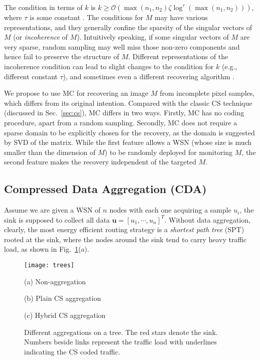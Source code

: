 \documentclass[conference]{IEEEtran}
\begin{document}
    The condition in terms of $k$ is $k \ge \mathcal{O}(\max(n_1,n_2) \zeta \log^\tau\!(\max(n_1,n_2)))$, where $\tau$ is some constant \cite{CandesP-ProcIEEE10}. The conditions for $M$ may have various representations, and they generally confine the sparsity of the singular vectors of $M$ (or \textit{incoherence} of $M$). Intuitively speaking, if some singular vectors of $M$ are very sparse, random sampling may well miss those non-zero components and hence fail to preserve the structure of $M$. Different representations of the incoherence condition can lead to slight changes to the condition for $k$ (e.g., different constant $\tau$), and sometimes even a different recovering algorithm \cite{CandesP-ProcIEEE10}.

    We propose to use MC for recovering an image $M$ from incomplete pixel samples, which differs from its original intention. Compared with the classic CS technique (discussed in Sec.~\ref{sec:cs}), MC differs in two ways. Firstly, MC has no coding procedure, apart from a random sampling. Secondly, MC does not require a sparse domain to be explicitly chosen for the recovery, as the domain is suggested by SVD of the matrix. While the first feature allows a WSN (whose size is much smaller than the dimension of $M$) to be randomly deployed for monitoring $M$, the second feature makes the recovery independent of the targeted $M$.

  \subsection{Compressed Data Aggregation (CDA)} \label{sec:csrt}
Assume we are given a WSN of $n$ nodes with each one acquiring a sample $u_i$, the sink is supposed to collect all data $\mathbf{u} = [u_1, \cdots, u_n]^T$. Without data aggregation, clearly, the most energy efficient routing strategy is a \textit{shortest path tree} (SPT) rooted at the sink, where the nodes around the sink tend to carry heavy traffic load, as shown in Fig.~\ref{fig:aggtrees}(a).
    \begin{figure}[htb]
      \centering
      \texttt{[image: trees]}
      \parbox{.3\columnwidth}{\center\scriptsize(a) Non-aggregation}
      \parbox{.33\columnwidth}{\center\scriptsize(b) Plain CS aggregation}
      \parbox{.33\columnwidth}{\center\scriptsize(c) Hybrid CS aggregation}
      \caption{Different aggregations on a tree. The red stars denote the sink. Numbers beside links represent the traffic load with underlines indicating the CS coded traffic.}
      \label{fig:aggtrees}
    \end{figure}
\end{document}
